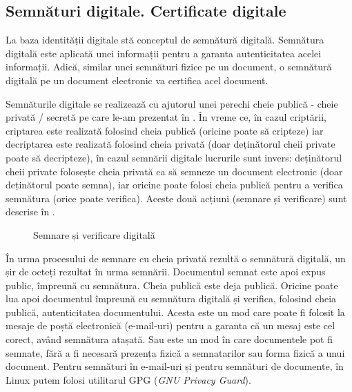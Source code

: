 \subsection{Semnături digitale. Certificate digitale}
\label{sec:sec:transfer:sign}

La baza identității digitale stă conceptul de semnătură digitală. Semnătura digitală este aplicată unei informații pentru a garanta autenticitatea acelei informații. Adică, similar unei semnături fizice pe un document, o semnătură digitală pe un document electronic va certifica acel document.

Semnăturile digitale se realizează cu ajutorul unei perechi cheie publică - cheie privată / secretă pe care le-am prezentat în . În vreme ce, în cazul criptării, criptarea este realizată folosind cheia publică (oricine poate să cripteze) iar decriptarea este realizată folosind cheia privată (doar deținătorul cheii private poate să decripteze), în cazul semnării digitale lucrurile sunt invers: deținătorul cheii private folosește cheia privată ca să semneze un document electronic (doar deținătorul poate semna), iar oricine poate folosi cheia publică pentru a verifica semnătura (orice poate verifica). Aceste două acțiuni (semnare și verificare) sunt descrise în .

\begin{figure}[htbp]
  \centering
  \def\svgwidth{\columnwidth}
  
  \caption{Semnare și verificare digitală}
  \label{fig:sec:digital-signature}
\end{figure}

În urma procesului de semnare cu cheia privată rezultă o semnătură digitală, un șir de octeți rezultat în urma semnării. Documentul semnat este apoi expus public, împreună cu semnătura. Cheia publică este deja publică. Oricine poate lua apoi documentul împreună cu semnătura digitală și verifica, folosind cheia publică, autenticitatea documentului. Acesta este un mod care poate fi folosit la mesaje de poștă electronică (e-mail-uri) pentru a garanta că un mesaj este cel corect, având semnătura atașată. Sau este un mod în care documentele pot fi semnate, fără a fi necesară prezența fizică a semnatarilor sau forma fizică a unui document. Pentru semnături în e-mail-uri și pentru semnături de documente, în Linux putem folosi utilitarul GPG (\textit{GNU Privacy Guard}).

